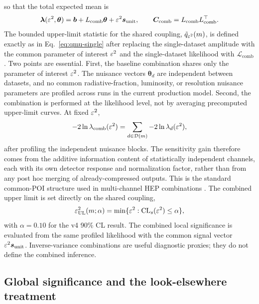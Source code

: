 so that the total expected mean is
\begin{equation}
\bm{\lambda}(\varepsilon^2,\bm{\theta})
= \bm{b} + L_{\mathrm{comb}}\bm{\theta} + \varepsilon^2\bm{s}_{\mathrm{unit}},
\qquad
\bm{C}_{\mathrm{comb}} = L_{\mathrm{comb}}L_{\mathrm{comb}}^\top.
\end{equation}
The bounded upper-limit statistic for the shared coupling,
$\tilde q_{\varepsilon^2}(m)$, is defined exactly as in Eq.~\eqref{eq:qmu-single} after
replacing the single-dataset amplitude with the common parameter of interest
$\varepsilon^2$ and the single-dataset likelihood with
$\mathcal{L}_{\mathrm{comb}}$. Two points are essential. First, the baseline
combination shares only the parameter of interest $\varepsilon^2$. The nuisance vectors
$\bm{\theta}_d$ are independent between datasets, and no common radiative-fraction,
luminosity, or resolution nuisance parameters are profiled across runs in the current
production model. Second, the combination is performed at the likelihood level, not by
averaging precomputed upper-limit curves. At fixed $\varepsilon^2$,
\begin{equation}
-2\ln\lambda_{\mathrm{comb}}(\varepsilon^2)
=
\sum_{d \in \mathcal{D}(m)} -2\ln\lambda_d(\varepsilon^2),
\end{equation}
after profiling the independent nuisance blocks. The sensitivity gain therefore comes
from the additive information content of statistically independent channels, each with
its own detector response and normalization factor, rather than from any post hoc
merging of already-compressed outputs. This is the standard common-POI structure used
in multi-channel HEP combinations \cite{HistFactory,ATLASCMSHiggs2016}. The combined
upper limit is set directly on the shared coupling,
\begin{equation}
\varepsilon^2_{\mathrm{UL}}(m;\alpha)
= \min\{\varepsilon^2 : \mathrm{CL}_s(\varepsilon^2)\le\alpha\},
\end{equation}
with $\alpha=0.10$ for the v4 90\% CL result. The combined local significance is
evaluated from the same profiled likelihood
with the common signal vector $\varepsilon^2 \bm{s}_{\mathrm{unit}}$. Inverse-variance
combinations are useful diagnostic proxies; they do not define the combined inference.

\subsection{Global significance and the look-elsewhere treatment}

